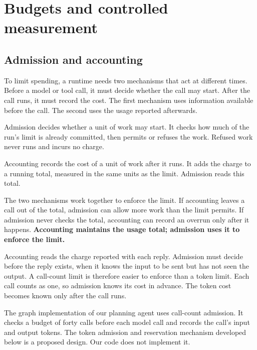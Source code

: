 \section{Budgets and controlled measurement}
\label{sec:budgets}

\subsection{Admission and accounting}
\label{sec:budgets-admission}

To limit spending, a runtime needs two mechanisms that act at different times. Before a model or tool
call, it must decide whether the call may start. After the call runs, it must record the cost.
The first mechanism uses information available before the call. The second uses the usage reported
afterwards.

\begin{definition}[Admission]
\label{def:admission}
Admission decides whether a unit of work may start. It checks how much of the run's limit is
already committed, then permits or refuses the work. Refused work never runs and incurs no charge.
\end{definition}

\begin{definition}[Accounting]
\label{def:accounting}
Accounting records the cost of a unit of work after it runs. It adds the charge to a running
total, measured in the same units as the limit. Admission reads this total.
\end{definition}

The two mechanisms work together to enforce the limit. If accounting leaves a call out of the
total, admission can allow more work than the limit permits. If admission never checks the total,
accounting can record an overrun only after it happens. \textbf{Accounting maintains the usage
total; admission uses it to enforce the limit.}

Accounting reads the charge reported with each reply. Admission must decide before the reply
exists, when it knows the input to be sent but has not seen the output. A call-count limit is
therefore easier to enforce than a token limit. Each call counts as one, so admission knows its
cost in advance. The token cost becomes known only after the call runs.

The graph implementation of our planning agent uses call-count admission. It checks a budget of
forty calls before each model call and records the call's input and output tokens. The token
admission and reservation mechanism developed below is a proposed design. Our code does not
implement it.

